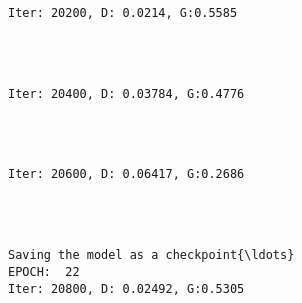 \documentclass[11pt]{article}
\begin{document}
    \begin{Verbatim}[commandchars=\\\{\}]

Iter: 20200, D: 0.0214, G:0.5585
    \end{Verbatim}

    \begin{center}
    \end{center}
    { \hspace*{\fill} \\}
    
    \begin{Verbatim}[commandchars=\\\{\}]

Iter: 20400, D: 0.03784, G:0.4776
    \end{Verbatim}

    \begin{center}
    \end{center}
    { \hspace*{\fill} \\}
    
    \begin{Verbatim}[commandchars=\\\{\}]

Iter: 20600, D: 0.06417, G:0.2686
    \end{Verbatim}

    \begin{center}
    \end{center}
    { \hspace*{\fill} \\}
    
    \begin{Verbatim}[commandchars=\\\{\}]

Saving the model as a checkpoint{\ldots}
EPOCH:  22
Iter: 20800, D: 0.02492, G:0.5305
    \end{Verbatim}

    \begin{center}
    \end{center}
    { \hspace*{\fill} \\}
    
\end{document}
